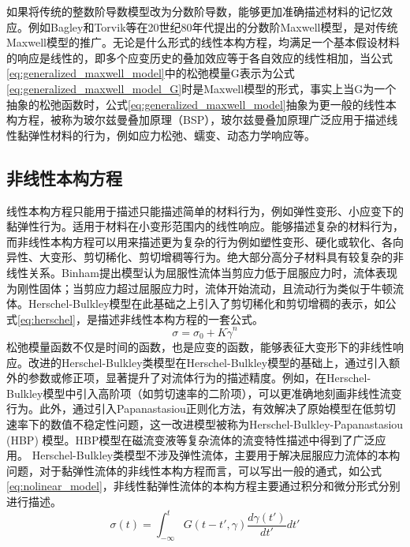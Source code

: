 如果将传统的整数阶导数模型改为分数阶导数，能够更加准确描述材料的记忆效应。例如Bagley和Torvik等在20世纪80年代提出的分数阶Maxwell模型，是对传统Maxwell模型的推广\cite{bagley1986fractional}。无论是什么形式的线性本构方程，均满足一个基本假设材料的响应是线性的，即多个应变历史的叠加效应等于各自效应的线性相加，当公式\eqref{eq:generalized_maxwell_model}中的松弛模量G表示为公式\eqref{eq:generalized_maxwell_model_G}时是Maxwell模型的形式，事实上当G为一个抽象的松弛函数时，公式\eqref{eq:generalized_maxwell_model}抽象为更一般的线性本构方程，被称为玻尔兹曼叠加原理（BSP），玻尔兹曼叠加原理广泛应用于描述线性黏弹性材料的行为，例如应力松弛、蠕变、动态力学响应等\cite{boltzmannZurTheorieElastischen1878}。
\subsection{非线性本构方程}
线性本构方程只能用于描述只能描述简单的材料行为，例如弹性变形、小应变下的黏弹性行为\cite{fedorowiczElasticPerfectlyPlastic2024,lingComparisonReviewClassical2023,ricarteTutorialReviewLinear2024}。适用于材料在小变形范围内的线性响应。能够描述复杂的材料行为，而非线性本构方程可以用来描述更为复杂的行为例如塑性变形、硬化或软化、各向异性、大变形、剪切稀化、剪切增稠等行为。绝大部分高分子材料具有较复杂的非线性关系。Binham提出模型认为屈服性流体当剪应力低于屈服应力时，流体表现为刚性固体；当剪应力超过屈服应力时，流体开始流动，且流动行为类似于牛顿流体\cite{binghaminvestigation}。Herschel-Bulkley模型在此基础之上引入了剪切稀化和剪切增稠的表示，如公式\eqref{eq:herschel}，是描述非线性本构方程的一套公式\cite{herschel1926konsistenzmessungen}。
\begin{equation}
	\sigma=\sigma_0+K\dot{\gamma}^n \label{eq:herschel}
\end{equation}
松弛模量函数不仅是时间的函数，也是应变的函数，能够表征大变形下的非线性响应。改进的Herschel-Bulkley类模型在Herschel-Bulkley模型的基础上，通过引入额外的参数或修正项，显著提升了对流体行为的描述精度。例如，在Herschel-Bulkley模型中引入高阶项（如剪切速率的二阶项），可以更准确地刻画非线性流变行为\cite{magnon2021precise}。此外，通过引入Papanastasiou正则化方法，有效解决了原始模型在低剪切速率下的数值不稳定性问题，这一改进模型被称为Herschel-Bulkley-Papanastasiou (HBP) 模型。HBP模型在磁流变液等复杂流体的流变特性描述中得到了广泛应用\cite{papanastasiou1987flows}。
Herschel-Bulkley类模型不涉及弹性流体，主要用于解决屈服应力流体的本构问题，对于黏弹性流体的非线性本构方程而言，可以写出一般的通式，如公式\eqref{eq:nolinear_model}，非线性黏弹性流体的本构方程主要通过积分和微分形式分别进行描述\cite{ewoldtDesigningComplexFluids2022}。
\begin{equation}
	\sigma(t) = \int_{-\infty}^{t} G(t-t',\gamma) \frac{d\gamma(t')}{dt'} dt' \label{eq:nolinear_model}
\end{equation}

